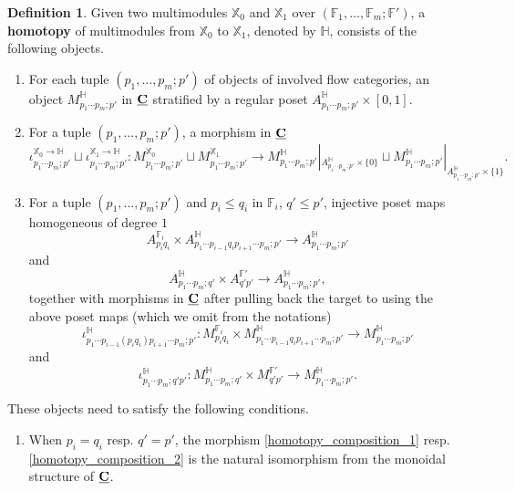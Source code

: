\documentclass[reqno, 10pt]{amsart}
\numberwithin{equation}{section}
\numberwithin{equation}{section}
\theoremstyle{definition}
\newtheorem{defn}[thm]{Definition}
\theoremstyle{remark}
\newcommand{\beq}{\begin{equation}}
\newcommand{\eeq}{\end{equation}}
\newcommand{\beqn}{\begin{equation*}}
\newcommand{\eeqn}{\end{equation*}}
\newcommand{\mb}{\mathbb}
\newcommand{\uds}[1]{\underline{\smash{#1}}}
\begin{document}
\begin{defn}\label{homotopy_modules}
Given two multimodules ${\mb X}_0$ and ${\mb X}_1$ over $({\mb F}_1, \ldots, {\mb F}_m; {\mb F}')$, a {\bf homotopy} of multimodules  from ${\mb X}_0$ to ${\mb X}_1$, denoted by ${\mb H}$, consists of the following objects.
\begin{enumerate}

\item For each tuple $(p_1, \ldots, p_m; p')$ of objects of involved flow categories, an object $M_{p_1 \cdots p_m; p'}^{{\mb H}}$ in $\uds{\bf C}$ stratified by a regular poset $A_{p_1 \cdots p_m; p'}^{\mb H} \times [0,1]$.

\item For a tuple $(p_1, \ldots, p_m; p')$, a morphism in $\uds{\bf C}$
\beqn
 \iota_{p_1\cdots p_m; p'}^{{\mb X}_0 \to {\mb H}} \sqcup \iota_{p_1 \cdots p_m; p'}^{{\mb X}_1\to {\mb H}}: M_{p_1 \cdots p_m; p'}^{{\mb X}_0} \sqcup M_{ p_1 \cdots p_m; p'}^{{\mb X}_1}  \to M_{p_1\cdots p_m; p'}^{\mb H}|_{A_{p_1 \cdots p_m; p'}^{\mb H} \times \{0\}} \sqcup M_{p_1\cdots p_m; p'}^{\mb H}|_{A_{p_1 \cdots p_m; p'}^{\mb H} \times \{1\}}.
\eeqn

\item For a tuple $(p_1, \ldots, p_m; p')$ and $p_i \leq q_i$ in ${\mb F}_i$, $q' \leq p'$, injective poset maps homogeneous of degree $1$
\beqn
A_{p_i q_i}^{{\mb F}_i} \times A_{p_1 \cdots p_{i-1} q_i p_{i+1} \cdots p_m; p'}^{\mb H}  \to A_{p_1 \cdots p_m; p'}^{{\mb H}}
\eeqn
and
\beqn
A_{p_1 \cdots p_m; q'}^{\mb H} \times A_{q'p'}^{{\mb F}'} \to A_{p_1 \cdots p_m; p'}^{\mb H},
\eeqn
together with morphisms in $\uds{\bf C}$ after pulling back the target to using the above poset maps (which we omit from the notations)
\beq\label{homotopy_composition_1}
\iota_{p_1 \cdots p_{i-1}(p_iq_i) p_{i+1}\cdots p_m; p'}^{\mb H}: M_{p_i q_i}^{{\mb F}_i} \times M_{p_1 \cdots p_{i-1} q_i p_{i+1} \cdots p_m; p'}^{\mb H}  \to M_{p_1 \cdots p_m; p'}^{{\mb H}}
\eeq
and 
\beq\label{homotopy_composition_2}
\iota_{p_1 \cdots p_m; q'p'}^{\mb H}: M_{p_1 \cdots p_m; q'}^{\mb H} \times M_{q'p'}^{{\mb F}'} \to M_{p_1 \cdots p_m; p'}^{\mb H}.
\eeq
\end{enumerate}
These objects need to satisfy the following conditions.
\begin{enumerate}

\item When $p_i = q_i$ resp. $q' = p'
$, the morphism \eqref{homotopy_composition_1} resp. \eqref{homotopy_composition_2} is the natural isomorphism from the monoidal structure of $\uds{\bf C}$.


\end{enumerate}
\end{defn}
\end{document}
